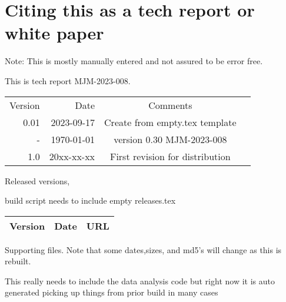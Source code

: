 \documentclass[aps,secnumarabic,balancelastpage,amsmath,amssymb,nofootinbib]{revtex4}
\def\mjmrelease{0.30 }
\newcommand{\mjmversion}{\mjmrelease} %
\newcommand{\mjmtrno}{MJM-2023-008}
\newcommand{\mjmversion}{0.00} %
\newcommand{\mjmtrno}{MJM-2023-008}
\newcommand{\mjmmakedate}{2023-09-17 }
\newcommand{\mjmbasename}{\jobname}
\begin{document}
\section{Citing this as a tech report or white paper }
\label{appendix:citing}

Note: This is mostly manually entered and not assured to be error free.

This is tech report \mjmtrno. 

\begin{table}[H] \centering
\begin{tabular}{r|r|c|r}
Version & Date & Comments  &  \\
0.01 & \mjmmakedate  &  Create from empty.tex template  &  \\
-  & \today & version  \mjmversion { }   \mjmtrno  &  \\
1.0 & 20xx-xx-xx & First revision for distribution &  \\
\end{tabular}
\end{table}


Released versions,

build script needs to include empty releases.tex
\begin{table}[H] \centering
\begin{tabular}{|r|r|l|}
Version & Date & URL    \\
\hline

\hline
\end{tabular}
\end{table}





%

\begin{minipage}{\linewidth}
%
%
\mjmshowbib
\end{minipage}





\vspace{1cm}
Supporting files. Note that some dates,sizes, and md5's will change as this is
rebuilt.

This really needs to include the data analysis code 
but right now it is auto generated picking up things from prior
build in many cases 

\end{document}
